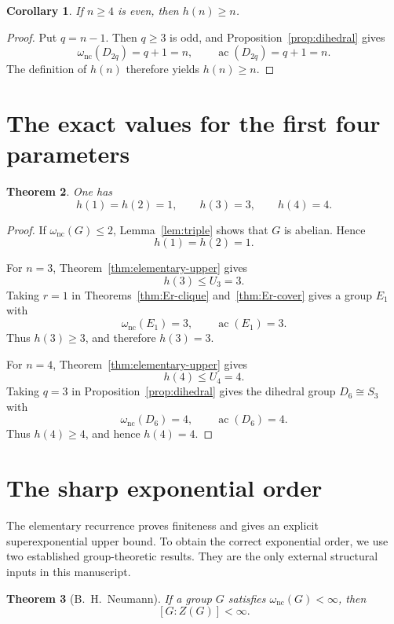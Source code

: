 \documentclass[11pt]{article}
\newtheorem{theorem}{Theorem}[section]
\newtheorem{corollary}[theorem]{Corollary}
\theoremstyle{definition}
\newcommand{\nc}{\omega_{\mathrm{nc}}}
\newcommand{\ac}{\operatorname{ac}}
\begin{document}
\begin{corollary}\label{cor:even-lower}
If $n\ge4$ is even, then $h(n)\ge n$.
\end{corollary}

\begin{proof}
Put $q=n-1$.  Then $q\ge3$ is odd, and Proposition~\ref{prop:dihedral} gives
\[
 \nc(D_{2q})=q+1=n,
 \qquad
 \ac(D_{2q})=q+1=n.
\]
The definition of $h(n)$ therefore yields $h(n)\ge n$.
\end{proof}

\section{The exact values for the first four parameters}

\begin{theorem}\label{thm:small-values}
One has
\[
 h(1)=h(2)=1,
 \qquad
 h(3)=3,
 \qquad
 h(4)=4.
\]
\end{theorem}

\begin{proof}
If $\nc(G)\le2$, Lemma~\ref{lem:triple} shows that $G$ is abelian.  Hence
\[
 h(1)=h(2)=1.
\]

For $n=3$, Theorem~\ref{thm:elementary-upper} gives
\[
 h(3)\le U_3=3.
\]
Taking $r=1$ in Theorems~\ref{thm:Er-clique} and~\ref{thm:Er-cover} gives a group $E_1$ with
\[
 \nc(E_1)=3,
 \qquad
 \ac(E_1)=3.
\]
Thus $h(3)\ge3$, and therefore $h(3)=3$.

For $n=4$, Theorem~\ref{thm:elementary-upper} gives
\[
 h(4)\le U_4=4.
\]
Taking $q=3$ in Proposition~\ref{prop:dihedral} gives the dihedral group $D_6\cong S_3$ with
\[
 \nc(D_6)=4,
 \qquad
 \ac(D_6)=4.
\]
Thus $h(4)\ge4$, and hence $h(4)=4$.
\end{proof}

\section{The sharp exponential order}\label{sec:pyber}

The elementary recurrence proves finiteness and gives an explicit
superexponential upper bound.  To obtain the correct exponential order, we
use two established group-theoretic results.  They are the only external
structural inputs in this manuscript.

\begin{theorem}[B.~H.~Neumann]\label{thm:neumann}
If a group $G$ satisfies $\nc(G)<\infty$, then
\[
 [G:Z(G)]<\infty.
\]
\end{theorem}
\end{document}
